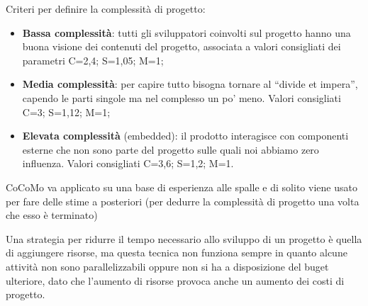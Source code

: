 Criteri per definire la complessità di progetto:
\begin{itemize}
\item \textbf{Bassa complessità}: tutti gli sviluppatori coinvolti sul progetto hanno una buona visione dei contenuti del progetto, associata a valori consigliati dei parametri C=2,4; S=1,05; M=1;
\item \textbf{Media complessità}: per capire tutto bisogna tornare al ``divide et impera'', capendo le parti singole ma nel complesso un po' meno. Valori consigliati C=3; S=1,12; M=1;
\item \textbf{Elevata complessità} (embedded): il prodotto interagisce con componenti esterne che non sono parte del progetto sulle quali noi abbiamo zero influenza. Valori consigliati C=3,6; S=1,2; M=1. 
\end{itemize}
CoCoMo va applicato su una base di esperienza alle spalle e di solito viene usato per fare delle stime a posteriori (per dedurre la complessità di progetto una volta che esso è terminato)

Una strategia per ridurre il tempo necessario allo sviluppo di un progetto è quella di aggiungere risorse, ma questa tecnica non funziona sempre in quanto alcune attività non sono parallelizzabili oppure non si ha a disposizione del buget ulteriore, dato che l'aumento di risorse provoca anche un aumento dei costi di progetto. 

